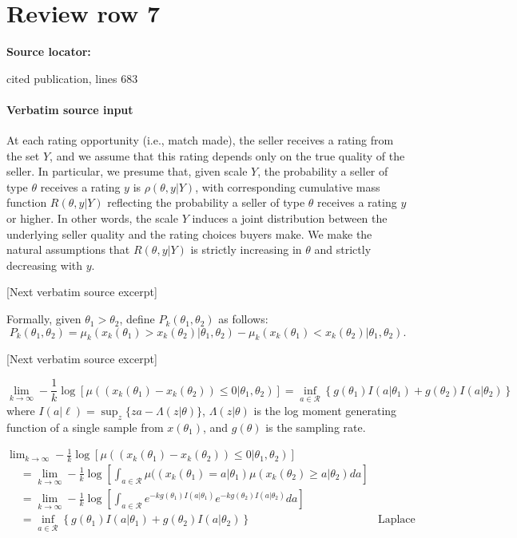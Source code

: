 \documentclass[10pt]{article}
\begin{document}
\section*{Review row 7}
\textbf{Source locator:} {\footnotesize\raggedright cited publication, lines 683\par}
\paragraph{Verbatim source input}
\begin{ReviewVerbatim}
At each rating opportunity (i.e., match made), the seller receives a rating from the set $Y$, and we assume that this rating depends only on the true quality of the seller. In particular, we presume that, given scale $Y$, the probability a seller of type $\theta$ receives a rating $y$ is $\rho(\theta, y | Y)$, with corresponding cumulative mass function $R(\theta,y| Y)$ reflecting the probability a seller of type $\theta$ receives a rating $y$ or higher. In other words, the scale $Y$ induces a joint distribution between the underlying seller quality and the rating choices buyers make. We make the natural assumptions that $R(\theta,y| Y)$ is strictly increasing in $\theta$ and strictly decreasing with $y$.

[Next verbatim source excerpt]

Formally, given $\theta_1 > \theta_2$, define $P_k(\theta_1, \theta_2)$ as follows:
\begin{equation}
\label{eq:Pk}
P_k(\theta_1, \theta_2) = \mu_k(x_k(\theta_1) > x_k(\theta_2)|\theta_1, \theta_2) - \mu_k(x_k(\theta_1) < x_k(\theta_2)|\theta_1, \theta_2).
\end{equation}

[Next verbatim source excerpt]

\begin{lemma}
	$$	\lim_{k \to \infty}- \frac{1}{k} \log \left[\mu((x_k(\theta_1) - x_k(\theta_2)) \leq 0 | \theta_1 , \theta_2)\right] = \inf_{a \in \mathcal{R}} \left \{ g(\theta_1) I(a|\theta_1) + g(\theta_2) I(a|\theta_2) \right \}$$ where $I(a|\ell) = \sup_z \{ za - \Lambda(z|\theta) \}$, $\Lambda(z|\theta)$ is the log moment generating function of a single sample from $x(\theta_1)$, and $g(\theta)$ is the sampling rate. \label{lem:problessthan}
\end{lemma}
%
	\proof
	\noindent$\lim_{k \to \infty}- \frac{1}{k} \log \left[\mu((x_k(\theta_1) - x_k(\theta_2)) \leq 0 | \theta_1 , \theta_2)\right]$
	\begin{align}
	&= \lim_{k \to \infty}- \frac{1}{k} \log \left[\int_{a\in \mathcal{R}} \mu((x_k(\theta_1) = a | \theta_1 ) \mu(x_k(\theta_2) \geq a |\theta_2)da\right]\\
	&= \lim_{k \to \infty}- \frac{1}{k} \log \left[\int_{a\in \mathcal{R}} e^{-kg(\theta_1) I (a | \theta_1)} e^{-kg(\theta_2) I (a | \theta_2)}da\right] \label{eqnpart:applyld}\\
	&= \inf_{a \in \mathcal{R}} \left \{ g(\theta_1) I(a|\theta_1) + g(\theta_2) I(a|\theta_2) \right \} & \text{Laplace principle}
	\end{align}
%


\end{ReviewVerbatim}
\end{document}
